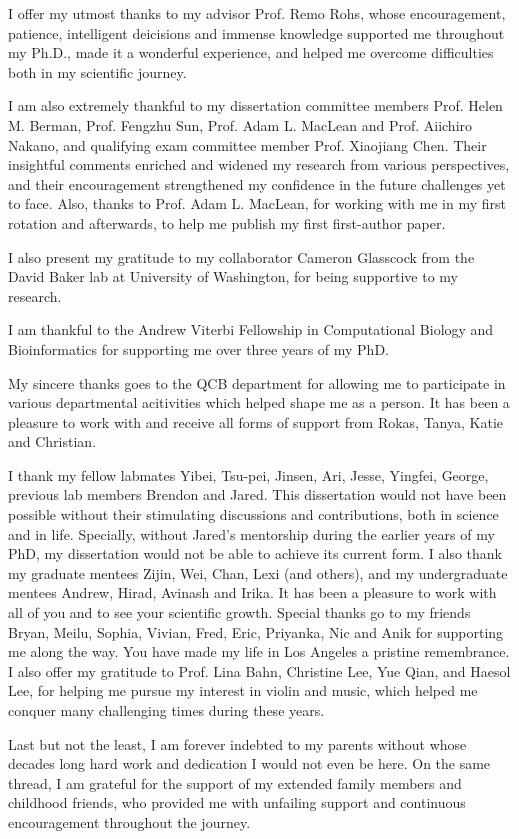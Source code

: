 
I offer my utmost thanks to my advisor Prof. Remo Rohs, whose encouragement, patience, intelligent deicisions and immense knowledge supported me throughout my Ph.D., made it a wonderful experience, and helped me overcome difficulties both in my scientific journey.

I am also extremely thankful to my dissertation committee members Prof. Helen M. Berman, Prof. Fengzhu Sun, Prof. Adam L. MacLean and Prof. Aiichiro Nakano, and qualifying exam committee member Prof. Xiaojiang Chen. Their insightful comments enriched and widened my research from various perspectives, and their encouragement strengthened my confidence in the future challenges yet to face. Also, thanks to Prof. Adam L. MacLean, for working with me in my first rotation and afterwards, to help me publish my first first-author paper.

I also present my gratitude to my collaborator Cameron Glasscock from the David Baker lab at University of Washington, for being supportive to my research. 

I am thankful to the Andrew Viterbi Fellowship in Computational Biology and Bioinformatics for supporting me over three years of my PhD.

My sincere thanks goes to the QCB department for allowing me to participate in various departmental acitivities which helped shape me as a person. It has been a pleasure to work with and receive all forms of support from Rokas, Tanya, Katie and Christian.

I thank my fellow labmates Yibei, Tsu-pei, Jinsen, Ari, Jesse, Yingfei, George, previous lab members Brendon and Jared. This dissertation would not have been possible without their stimulating discussions and contributions, both in science and in life. Specially, without Jared's mentorship during the earlier years of my PhD, my dissertation would not be able to achieve its current form. I also thank my graduate mentees Zijin, Wei, Chan, Lexi (and others), and my undergraduate mentees Andrew, Hirad, Avinash and Irika. It has been a pleasure to work with all of you and to see your scientific growth. 
Special thanks go to my friends Bryan, Meilu, Sophia, Vivian, Fred, Eric, Priyanka, Nic and Anik for supporting me along the way. You have made my life in Los Angeles a pristine remembrance. I also offer my gratitude to Prof. Lina Bahn, Christine Lee, Yue Qian, and Haesol Lee, for helping me pursue my interest in violin and music, which helped me conquer many challenging times during these years.

Last but not the least, I am forever indebted to my parents without whose decades long hard work and dedication I would not even be here. On the same thread, I am grateful for the support of my extended family members and childhood friends, who provided me with unfailing support and continuous encouragement throughout the journey.